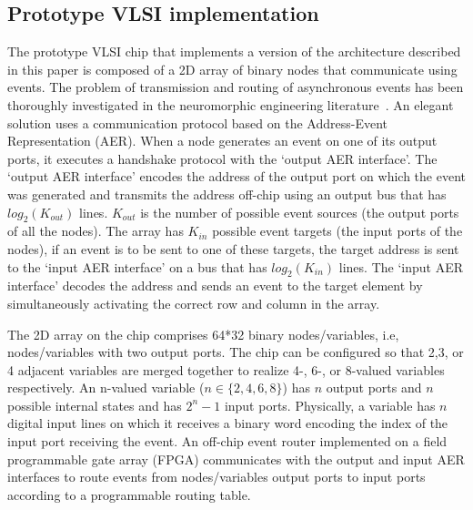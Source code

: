 \documentclass[10pt]{article}
\begin{document}
\subsection*{Prototype VLSI implementation}
The prototype VLSI chip that implements a version of the architecture described in this paper is composed of a 2D array of binary nodes that communicate using events. The problem of transmission and routing of asynchronous events has been thoroughly investigated in the neuromorphic engineering literature~\cite{Deiss_etal98,Boahen00}. An elegant solution uses a communication protocol based on the Address-Event Representation (AER). 
When a node generates an event on one of its output ports, it executes a handshake protocol with the `output AER interface'. The `output AER interface' encodes the address of the output port on which the event was generated and transmits the address off-chip using an output bus that has $log_2(K_{out})$ lines. $K_{out}$ is the number of possible event sources (the output ports of all the nodes). The array has $K_{in}$ possible event targets (the input ports of the nodes), if an event is to be sent to one of these targets, the target address is sent to the `input AER interface' on a bus that has $log_2(K_{in})$ lines. The `input AER interface' decodes the address and sends an event to the target element by simultaneously activating the correct row and column in the array.

The 2D array on the chip comprises 64*32 binary nodes/variables, i.e, nodes/variables with two output ports. The chip can be configured so that 2,3, or 4 adjacent variables are merged together to realize 4-, 6-, or 8-valued variables respectively. An n-valued variable ($n \in \{2,4,6,8\}$) has $n$ output ports and $n$ possible internal states and has $2^n-1$ input ports. Physically, a variable has $n$ digital input lines on which it receives a binary word encoding the index of the input port receiving the event. 
An off-chip event router implemented on a field programmable gate array (FPGA) communicates with the output and input AER interfaces to route events from nodes/variables output ports to input ports according to a programmable routing table. 
\end{document}
